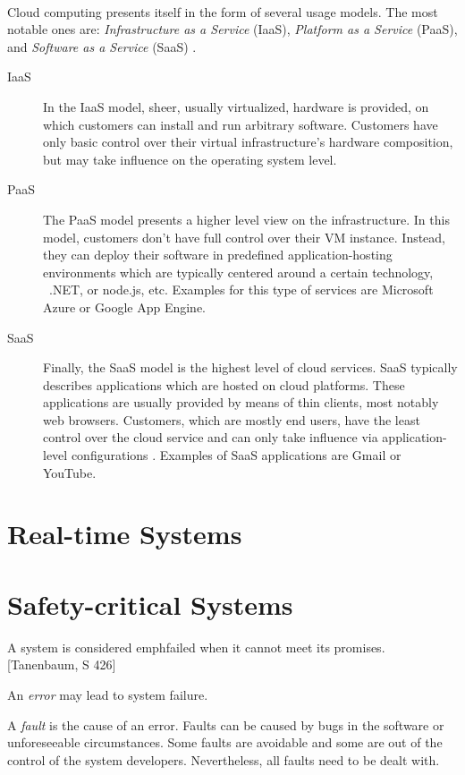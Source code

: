 \paragraph{}
Cloud computing presents itself in the form of several usage models. The most notable ones are: \emph{Infrastructure as a Service} (IaaS),  \emph{Platform as a Service} (PaaS),  and \emph{Software as a Service} (SaaS) \cite{mell2011nist}.

\begin{description}
\item[IaaS] In the IaaS model, sheer, usually virtualized, hardware is provided, on which customers can install and run arbitrary software. Customers have only basic control over their virtual infrastructure's hardware composition, but may take influence on the operating system level.
\item[PaaS] The PaaS model presents a higher level view on the infrastructure. In this model, customers don't have full control over their VM instance. Instead, they can deploy their software in predefined application-hosting environments \cite{mell2011nist} which are typically centered around a certain technology, \eg\ .NET, or node.js, etc. Examples for this type of services are Microsoft Azure or Google App Engine.
\item[SaaS] Finally, the SaaS model is the highest level of cloud services. SaaS typically describes applications which are hosted on cloud platforms. These applications are usually provided by means of thin clients, most notably web browsers. Customers, which are mostly end users, have the least control over the cloud service and can only take influence via application-level configurations \cite{mell2011nist}. Examples of SaaS applications are Gmail or YouTube.
\end{description}


\section{Real-time Systems}

\section{Safety-critical Systems}
A system is considered emph{failed} when it cannot meet its promises. [Tanenbaum, S 426]

An \emph{error} may lead to system failure.

A \emph{fault} is the cause of an error. Faults can be caused by bugs in the software or unforeseeable circumstances. Some faults are avoidable and some are out of the control of the system developers. Nevertheless, all faults need to be dealt with.

